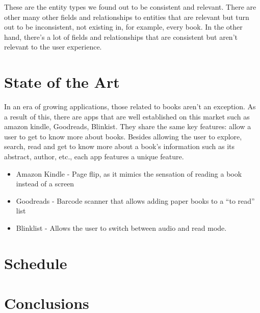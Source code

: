 \documentclass[twocolumn,twoside,11pt,a4paper]{article}
\begin{document}
These are the entity types we found out to be consistent and relevant. There are other many other fields and relationships to entities that are relevant but turn out to be inconsistent, not existing in, for example, every book. In the other hand, there's a lot of fields and relationships that are consistent but aren't relevant to the user experience.


\section{State of the Art}\label{sec:conclusions}

 In an era of growing applications, those related to books aren’t an exception. As a result of this, there are apps that are well established on this market such as amazon kindle, Goodreads, Blinkist. They share the same key features: allow a user to get to know more about books. Besides allowing the user to explore, search, read and get to know more about a book’s information such as its abstract, author, etc., each app features a unique feature.

\begin{itemize}
    \item Amazon Kindle - Page flip, as it mimics the sensation of reading a book instead of a screen
    \item Goodreads - Barcode scanner that allows adding paper books to a “to read” list
    \item Blinklist - Allows the user to switch between audio and read mode.
\end{itemize}




\section{Schedule}\label{sec:conclusions}


\section{Conclusions}\label{sec:conclusions}



\renewcommand{\bibname}{Referências}
%
%

%


\end{document}
